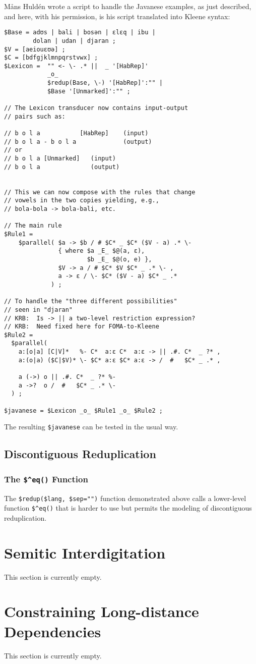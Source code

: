 M\r{a}ns Huldén wrote a  script to handle the Javanese examples, as
just described, and here, with his permission, is his script translated into Kleene syntax:

\begin{Verbatim}
$Base = adʊs | bali | bosən | ɛlɛq | ibu | 
        dolan | udan | djaran ;
$V = [aeiouɛʊə] ;
$C = [bdfgjklmnpqrstvwx] ;
$Lexicon =  "" <- \- .* ||  _ '[HabRep]'
            _o_
            $redup(Base, \-) '[HabRep]':"" | 
			$Base '[Unmarked]':"" ;

// The Lexicon transducer now contains input-output
// pairs such as:

// b o l a           [HabRep]    (input)     
// b o l a - b o l a             (output)         
// or
// b o l a [Unmarked]   (input)
// b o l a              (output)


// This we can now compose with the rules that change
// vowels in the two copies yielding, e.g., 
// bola-bola -> bola-bali, etc.

// The main rule
$Rule1 =  
    $parallel( $a -> $b / # $C* _ $C* ($V - a) .* \-
               { where $a _E_ $@(a, ɛ), 
                       $b _E_ $@(o, e) },
               $V -> a / # $C* $V $C* _ .* \- ,
               a -> ɛ / \- $C* ($V - a) $C* _ .*
             ) ;

// To handle the "three different possibilities" 
// seen in "djaran"
// KRB:  Is -> || a two-level restriction expression?
// KRB:  Need fixed here for FOMA-to-Kleene
$Rule2 =  
  $parallel(
    a:[o|a] [C|V]*   %- C*  a:ɛ C*  a:ɛ -> || .#. C*  _ ?* ,
    a:(o|a) ($C|$V)* \- $C* a:ɛ $C* a:ɛ -> /  #   $C* _ .* ,

    a (->) o || .#. C*  _ ?* %- 
    a ->?  o /  #   $C* _ .* \-
  ) ;

$javanese = $Lexicon _o_ $Rule1 _o_ $Rule2 ;
\end{Verbatim}

\noindent
The resulting \verb!$javanese! \fst{} can be tested in the usual way.

\subsection{Discontiguous Reduplication}

\cprotect\subsubsection{The \verb!$^eq()! Function}

The \verb!$redup($lang, $sep="")! function demonstrated above calls a lower-level
function \verb!$^eq()! that is harder to use but permits the modeling of
discontiguous reduplication.


\section{Semitic Interdigitation}

This section is currently empty.

\section{Constraining Long-distance Dependencies}

This section is currently empty.
